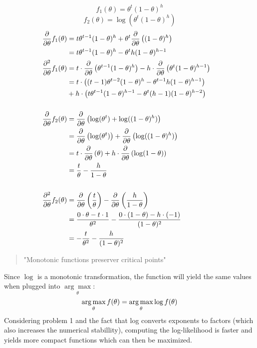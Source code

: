 %
%
\[ f_1(\theta) = \theta^t(1-\theta)^h \]
\[ f_2(\theta) = \log(\theta^t(1-\theta)^h) \]
\begin{align*}
\frac{\partial}{\partial \theta} f_1(\theta) &= t \theta^{t-1}(1-\theta)^h + \theta^t \frac{\partial}{\partial \theta}\left((1-\theta)^h\right) \\
&= t\theta^{t-1}(1-\theta)^h - \theta^t  h (1-\theta)^{h-1}
& \\
\frac{\partial^2}{\partial \theta} f_1(\theta) &= t \cdot \frac{\partial}{\partial \theta}\left(\theta^{t-1}(1-\theta)^h \right) - h \cdot \frac{\partial}{\partial \theta}\left(\theta^t (1-\theta)^{h-1}\right) \\
&= t \cdot \left((t-1)\theta^{t-2}(1-\theta)^h - \theta^{t-1}h(1-\theta)^{h-1}\right) \\
&+ h \cdot \left(t\theta^{t-1} (1-\theta)^{h-1} - \theta^t (h-1)(1-\theta)^{h-2}\right) \\
& \\
\frac{\partial}{\partial \theta} f_2(\theta) &= \frac{\partial}{\partial \theta}\left(\log(\theta^t) + \log((1-\theta)^h)\right) \\
&= \frac{\partial}{\partial \theta}\left(\log(\theta^t) \right) + \frac{\partial}{\partial \theta}\left(\log((1-\theta)^h)\right) \\
&= t \cdot \frac{\partial}{\partial \theta}\left(\theta\right) + h \cdot \frac{\partial}{\partial \theta}\left(\log(1-\theta)\right) \\
&= \frac{t}{\theta} - \frac{h}{1-\theta} \\
& \\
\frac{\partial^2}{\partial \theta} f_2(\theta) &= \frac{\partial}{\partial \theta}\left(\frac{t}{\theta}\right) - \frac{\partial}{\partial \theta}\left(\frac{h}{1-\theta}\right) \\
&= \frac{0\cdot \theta - t\cdot 1}{\theta^2} - \frac{0\cdot (1-\theta) - h \cdot (-1)}{(1-\theta)^2} \\
&= -\frac{t}{\theta^2} - \frac{h}{(1-\theta)^2}
\end{align*}
%
%
\newpage
%
%
\begin{quote}
"Monotonic functions preserver critical points"
\end{quote}
\begin{flushleft}
Since $\log$ is a monotonic transformation, the function will yield the same values when plugged into $\underset{\theta}{\arg\max}$:
\[ \operatorname*{arg\,max}_\theta f(\theta) = \operatorname*{arg\,max}_\theta \log f(\theta) \]
Considering problem 1 and the fact that log converts exponents to factors (which also increases the numerical stabillity), computing the log-likelihood is faster and yields more compact functions which can then be maximized.
\end{flushleft}
